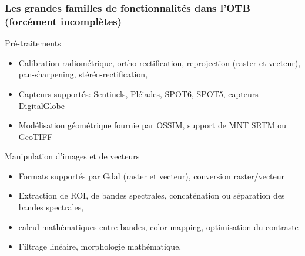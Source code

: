 \documentclass[8pt]{beamer}
\begin{document}
\begin{frame}
\frametitle{Les grandes familles de fonctionnalités dans l'OTB (forcément incomplètes)}

\begin{block}{Pré-traitements}
\begin{itemize}
\item Calibration radiométrique, ortho-rectification, reprojection (raster et vecteur), pan-sharpening, stéréo-rectification,
\item Capteurs supportés: Sentinels, Pléiades, SPOT6, SPOT5, capteurs DigitalGlobe
\item Modélisation géométrique fournie par OSSIM, support de MNT SRTM ou GeoTIFF
\end{itemize}
\end{block}

\begin{block}{Manipulation d'images et de vecteurs}
\begin{itemize}
\item Formats supportés par Gdal (raster et vecteur), conversion raster/vecteur
\item Extraction de ROI, de bandes spectrales, concaténation ou séparation des bandes spectrales,
\item calcul mathématiques entre bandes, color mapping, optimisation du contraste
\item Filtrage linéaire, morphologie mathématique,
\end{itemize}
\end{block}
\end{frame}
\end{document}
